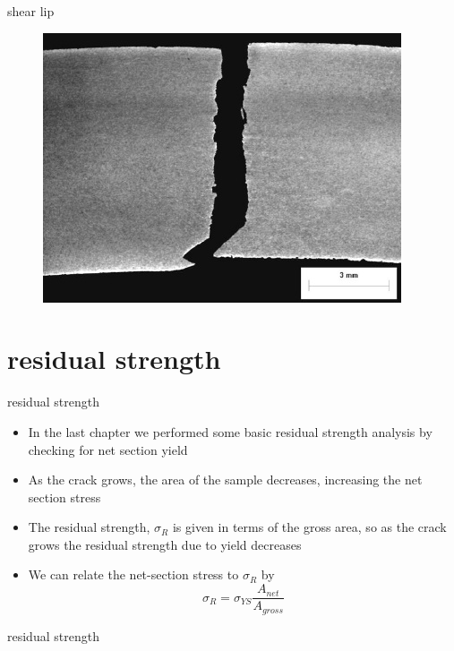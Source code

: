 \documentclass[10pt]{beamer}
\begin{document}
\begin{frame}{shear lip}
\begin{figure}
\centering
\includegraphics[width=0.7\linewidth]{shear_lip}
\label{fig:shear_lip}
\end{figure}
\end{frame}

\section{residual strength}

\begin{frame}{residual strength}
	\begin{itemize}[<+->]
		\item In the last chapter we performed some basic residual strength analysis by checking for net section yield
		\item As the crack grows, the area of the sample decreases, increasing the net section stress
		\item The residual strength, $\sigma_R$ is given in terms of the gross area, so as the crack grows the residual strength due to yield decreases
		\item We can relate the net-section stress to $\sigma_R$ by
		\begin{equation}
		\sigma_R = \sigma_{YS} \frac{A_{net}}{A_{gross}}
		\end{equation}
	\end{itemize}
\end{frame}

\begin{frame}{residual strength}
	\begin{figure}
	\end{figure}
\end{frame}
\end{document}
